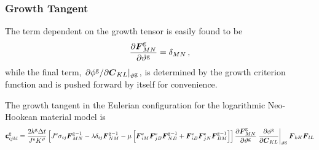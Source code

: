 \documentclass[10pt,letterpaper,oneside]{report}
\newcommand{\ten}[1]{\mbox{\boldmath $#1$}{}}
\newcommand{\tenf}[1]{\mbox{{\sffamily{\bfseries {#1}}}}}
\newcommand{\scas}[1]{\mbox{{\scriptsize{${\rm{#1}}$}}}{}}
\begin{document}
\begin{itemize}
\subsubsection{Growth Tangent}
The term dependent on the growth tensor is easily found to be
\begin{equation}
\frac{\partial \ten{F}^{\scas{g}}_{MN} }{\partial \vartheta^{\scas{g}}} = \delta_{MN}  \, , 
\end{equation}
while the final term, $ \left. \partial \phi^{\scas{g}} / \partial \ten{C}_{KL} \right|_{\vartheta^{\scas{g}}} $, is determined by the growth criterion function and is pushed forward by itself for convenience.  

The growth tangent in the Eulerian configuration for the logarithmic Neo-Hookean material model is
\begin{align}
\tenf{c}^{\scas{g}}_{ijkl} ={}& \frac{2 k^{\scas{g}} \Delta t}{J^{\scas{e}} K^\vartheta} \left[ J^{\scas{e}} \sigma_{ij} \ten{F}^{\scas{g}-1}_{MN} - \lambda \delta_{ij} \ten{F}^{\scas{g}-1}_{NM} 
- \mu \left[ \ten{F}^{\scas{e}}_{iM} \ten{F}^{\scas{e}}_{jB} \ten{F}^{\scas{g}-1}_{NB} + \ten{F}^{\scas{e}}_{iB} \ten{F}^{\scas{e}}_{jN} \ten{F}^{\scas{g}-1}_{BM} \right] \right] \frac{\partial \ten{F}^{\scas{g}}_{MN}}{\partial \vartheta^{\scas{g}}} \left. \frac{\partial \phi^{\scas{g}} }{\partial \ten{C}_{KL}} \right|_{\vartheta^{\scas{g}}} \ten{F}_{kK} \ten{F}_{lL} 
\\

\end{align}
\end{itemize}
\end{document}
